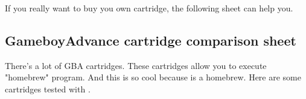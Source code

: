 \documentclass[12pt,a4paper]{article}
\begin{document}
    If you really want to buy you own cartridge, the following sheet can help you.

    \subsection{GameboyAdvance cartridge comparison sheet}

    There's a lot of GBA cartridges. These cartridges allow you to execute "homebrew" program. And this is so cool because \FAT is a homebrew.
    Here are some cartridges tested with \FAT.

    \tablelasttail{\hline}
\end{document}

